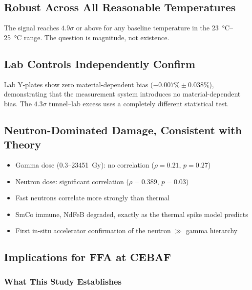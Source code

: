 \documentclass[11pt,letterpaper]{article}
\begin{document}
\subsection{Robust Across All Reasonable Temperatures}

The signal reaches $4.9\sigma$ or above for any baseline temperature in the
\SIrange{23}{25}{\celsius} range. The question is magnitude, not existence.

\subsection{Lab Controls Independently Confirm}

Lab Y-plates show zero material-dependent bias ($-0.007\% \pm 0.038\%$),
demonstrating that the measurement system introduces no material-dependent bias. The $4.3\sigma$ tunnel--lab excess
uses a completely different statistical test.

\subsection{Neutron-Dominated Damage, Consistent with Theory}

\begin{itemize}
    \item Gamma dose (0.3--\SI{23451}{Gy}): no correlation ($\rho = 0.21$,
    $p = 0.27$)
    \item Neutron dose: significant correlation ($\rho = 0.389$, $p = 0.03$)
    \item Fast neutrons correlate more strongly than thermal
    \item SmCo immune, NdFeB degraded, exactly as the thermal spike model
    predicts
    \item First in-situ accelerator confirmation of the neutron $\gg$ gamma
    hierarchy
\end{itemize}

\subsection{Implications for FFA at CEBAF}

\subsubsection{What This Study Establishes}
\end{document}
